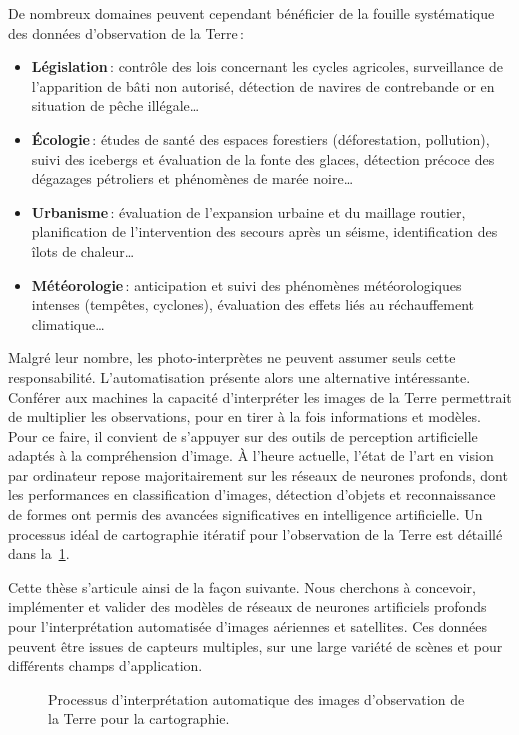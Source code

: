 De nombreux domaines peuvent cependant bénéficier de la fouille systématique des données d'observation de la Terre\,:
\begin{itemize}
	\item \textbf{Législation}\,: contrôle des lois concernant les cycles agricoles, surveillance de l'apparition de bâti non autorisé, détection de navires de contrebande or en situation de pêche illégale\dots
	\item \textbf{Écologie}\,: études de santé des espaces forestiers (déforestation, pollution), suivi des icebergs et évaluation de la fonte des glaces, détection précoce des dégazages pétroliers et phénomènes de marée noire\dots
	\item \textbf{Urbanisme}\,: évaluation de l'expansion urbaine et du maillage routier, planification de l'intervention des secours après un séisme, identification des îlots de chaleur\dots
	\item \textbf{Météorologie}\,: anticipation et suivi des phénomènes météorologiques intenses (tempêtes, cyclones), évaluation des effets liés au réchauffement climatique\dots
\end{itemize}

Malgré leur nombre, les photo-interprètes ne peuvent assumer seuls cette responsabilité. L'automatisation présente alors une alternative intéressante. Conférer aux machines la capacité d'interpréter les images de la Terre permettrait de multiplier les observations, pour en tirer à la fois informations et modèles. Pour ce faire, il convient de s'appuyer sur des outils de perception artificielle adaptés à la compréhension d'image. À l'heure actuelle, l'état de l'art en vision par ordinateur repose majoritairement sur les réseaux de neurones profonds, dont les performances en classification d'images, détection d'objets et reconnaissance de formes ont permis des avancées significatives en intelligence artificielle. Un processus idéal de cartographie itératif pour l'observation de la Terre est détaillé dans la~\cref{fig:workflow}.

Cette thèse s'articule ainsi de la façon suivante. Nous cherchons à concevoir, implémenter et valider des modèles de réseaux de neurones artificiels profonds pour l'interprétation automatisée d'images aériennes et satellites. Ces données peuvent être issues de capteurs multiples, sur une large variété de scènes et pour différents champs d'application.

\begin{figure}[h]
    \centering
    \def\svgwidth{\columnwidth}
    
		\caption{Processus d'interprétation automatique des images d'observation de la Terre pour la cartographie.}
		\label{fig:workflow}
\end{figure}

